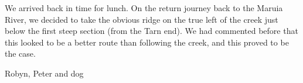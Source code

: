 \documentclass[12pt]{article} %
\begin{document}
We arrived back in time for lunch.  On the return journey back to the Maruia River, we decided to take the obvious ridge on the true left of the creek just below the first steep section (from the Tarn end).  We had commented before that this looked to be a better route than following the creek, and this proved to be the case.
\begin{flushright}
Robyn, Peter and dog
\end{flushright}
\end{document}
